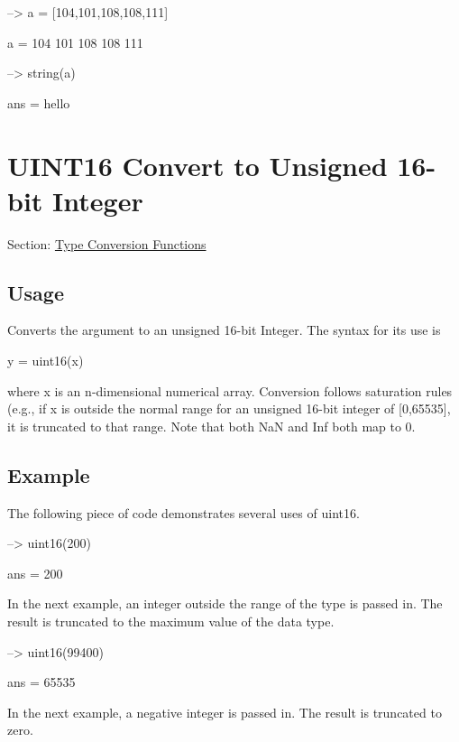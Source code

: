 \begin{DoxyVerbInclude}
--> a = [104,101,108,108,111]

a = 
 104 101 108 108 111 

--> string(a)

ans = 
hello
\end{DoxyVerbInclude}
 \hypertarget{typecast_uint16}{}\section{U\-I\-N\-T16 Convert to Unsigned 16-\/bit Integer}\label{typecast_uint16}
Section\-: \hyperlink{sec_typecast}{Type Conversion Functions} \hypertarget{vtkwidgets_vtkxyplotwidget_Usage}{}\subsection{Usage}\label{vtkwidgets_vtkxyplotwidget_Usage}
Converts the argument to an unsigned 16-\/bit Integer. The syntax for its use is \begin{DoxyVerb}   y = uint16(x)
\end{DoxyVerb}
 where {\ttfamily x} is an {\ttfamily n}-\/dimensional numerical array. Conversion follows saturation rules (e.\-g., if {\ttfamily x} is outside the normal range for an unsigned 16-\/bit integer of {\ttfamily \mbox{[}0,65535\mbox{]}}, it is truncated to that range. Note that both {\ttfamily Na\-N} and {\ttfamily Inf} both map to 0. \hypertarget{variables_struct_Example}{}\subsection{Example}\label{variables_struct_Example}
The following piece of code demonstrates several uses of {\ttfamily uint16}.


\begin{DoxyVerbInclude}
--> uint16(200)

ans = 
 200 
\end{DoxyVerbInclude}


In the next example, an integer outside the range of the type is passed in. The result is truncated to the maximum value of the data type.


\begin{DoxyVerbInclude}
--> uint16(99400)

ans = 
 65535 
\end{DoxyVerbInclude}


In the next example, a negative integer is passed in. The result is truncated to zero.


